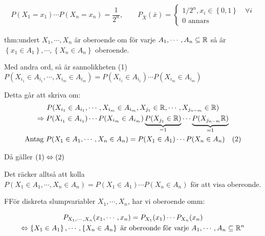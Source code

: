 \begin{equation*}
  \begin{gathered}
    P(X_1=x_1)\cdots P(X_n=x_n)=\dfrac{1}{2^n},\qquad P_{\bar{X}}(\bar{x}) = 
    \begin{cases*}
    1/2^n, x_i\in\left\{0,1\right\}\quad\forall i\\
    0\text{ annars}
    \end{cases*}
  \end{gathered}
\end{equation*}
\par\bigskip
\begin{theo}{thm:undert}
$X_1,\cdots,X_n$ är oberoende om för varje $A_1,\cdots,A_n\subseteq\mathbb{R}$ så är $\left\{x_1\in A_1\right\},\cdots,\left\{X_n\in A_n\right\}$ oberoende.
\end{theo}
\par\bigskip
\noindent Med andra ord, så är sannolikheten (1) $P(X_{i_{1}}\in A_{i_{1}},\cdots,X_{i_{m}}\in A_{i_{m}}) = P(X_{i_{1}}\in A_{i_{1}})\cdots P(X_{i_{m}}\in A_{i_{m}})$\par
\noindent Detta går att skriva om:
\begin{equation*}
  \begin{gathered}
    P(X_{i_{1}}\in A_{i_{1}},\cdots, X_{i_{m}}\in A_{i_{m}}, X_{j_{1}}\in\mathbb{R},\cdots, X_{j_{n-m}}\in\mathbb{R})\\
    \Rightarrow P(X_{i_{1}}\in A_{i_{1}})\cdots P(X_{i_{m}}\in A_{i_{m}})\underbrace{P(X_{j_{1}}\in\mathbb{R})}_{\text{=1}}\cdots \underbrace{P(X_{j_{n-m}}\mathbb{R})}_{\text{=1}}\\
    \text{Antag } P(X_1\in A_1,\cdots, X_n\in A_n) = P(X_1\in A_1)\cdots P(X_n\in A_n)\quad (2)
  \end{gathered}
\end{equation*}
\par\bigskip
\noindent Då gäller $(1)\Leftrightarrow (2)$\par
\noindent Det räcker alltså att kolla $P(X_1\in A_1,\cdots, X_n\in A_n) = P(X_1\in A_1)\cdots P(X_n\in A_n)$ för att visa obereonde.
\par\bigskip
\begin{theo}
  FFör diskreta slumpvariabler $X_1,\cdots, X_n$, har vi oberoende omm:\par 
  \begin{equation*}
    \begin{gathered}
      P_{X_1,\cdots,X_n}(x_1,\cdots,x_n) = P_{X_1}(x_1)\cdots P_{X_n}(x_n)\\
      \Leftrightarrow \left\{X_1\in A_1\right\},\cdots, \left\{X_n\in A_n\right\}\text{ är obereonde för varje } A_1,\cdots, A_n\subseteq\mathbb{R}^n
    \end{gathered}
  \end{equation*}
\end{theo}
